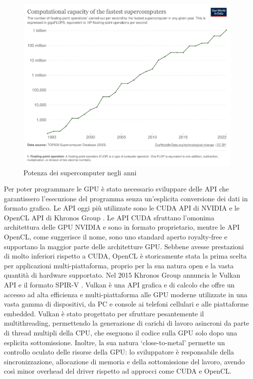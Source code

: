 \begin{figure}[ht]
\centering
\includegraphics[width=.9\linewidth]{images/chapter1/supercomputer_flops.png}
\caption{Potenza dei supercomputer negli anni}
\label{fig:supercomputer_flops}
\end{figure}
    

Per poter programmare le GPU è stato necessario sviluppare delle \gls{API} che garantissero l'esecuzione del programma senza un'esplicita conversione dei dati in formato grafico. Le API oggi più utilizzate sono le \gls{CUDA} API di NVIDIA \cite[]{NVIDIA:CUDA} e le OpenCL API di Khronos Group \cite[]{KG:OpenCL}. Le API CUDA sfruttano l'omonima architettura delle GPU NVIDIA e sono in formato proprietario, mentre le API OpenCL, come suggerisce il nome, sono uno standard aperto royalty-free e supportano la maggior parte delle architetture GPU. Sebbene avesse prestazioni di molto inferiori rispetto a CUDA, OpenCL è storicamente stata la prima scelta per applicazioni multi-piattaforma, proprio per la sua natura open e la vasta quantità di hardware supportato. Nel 2015 Khronos Group annuncia le Vulkan API \cite[]{KG:Vulkan} e il formato SPIR-V \cite[]{KG:SPIR-V}. Vulkan è una API grafica e di calcolo che offre un accesso ad alta efficienza e multi-piattaforma alle GPU moderne utilizzate in una vasta gamma di dispositivi, da PC e console ai telefoni cellulari e alle piattaforme embedded. Vulkan è stato progettato per sfruttare pesantemente il multithreading, permettendo la generazione di carichi di lavoro asincroni da parte di thread multipli della CPU, che eseguono il codice sulla GPU solo dopo una esplicita sottomissione. Inoltre, la sua natura `close-to-metal' permette un controllo oculato delle risorse della GPU: lo sviluppatore è responsabile della sincronizzazione, allocazione di memoria e della sottomissione del lavoro, avendo così minor overhead del driver rispetto ad approcci come CUDA e OpenCL.

